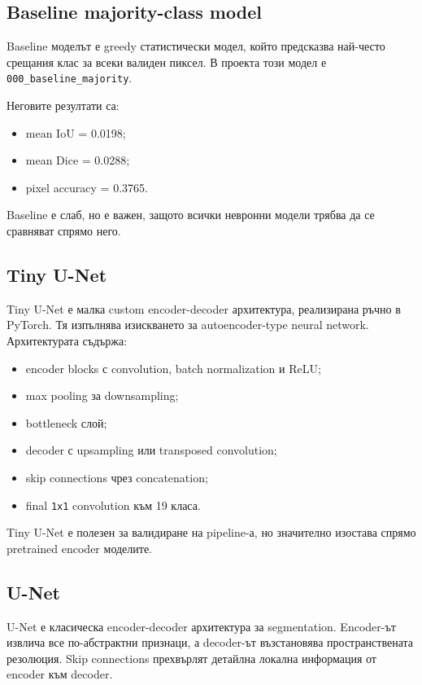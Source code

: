 \documentclass[12pt,a4paper]{article}
\newcommand{\code}[1]{\texttt{#1}}
\begin{document}
\subsection{Baseline majority-class model}

Baseline моделът е greedy статистически модел, който предсказва най-често срещания клас за всеки валиден пиксел. В проекта този модел е \code{000\_baseline\_majority}.

Неговите резултати са:

\begin{itemize}
  \item mean IoU = 0.0198;
  \item mean Dice = 0.0288;
  \item pixel accuracy = 0.3765.
\end{itemize}

Baseline е слаб, но е важен, защото всички невронни модели трябва да се сравняват спрямо него.

\subsection{Tiny U-Net}

Tiny U-Net е малка custom encoder-decoder архитектура, реализирана ръчно в PyTorch. Тя изпълнява изискването за autoencoder-type neural network. Архитектурата съдържа:

\begin{itemize}
  \item encoder blocks с convolution, batch normalization и ReLU;
  \item max pooling за downsampling;
  \item bottleneck слой;
  \item decoder с upsampling или transposed convolution;
  \item skip connections чрез concatenation;
  \item final \code{1x1} convolution към 19 класа.
\end{itemize}

Tiny U-Net е полезен за валидиране на pipeline-а, но значително изостава спрямо pretrained encoder моделите.

\subsection{U-Net}

U-Net е класическа encoder-decoder архитектура за segmentation. Encoder-ът извлича все по-абстрактни признаци, а decoder-ът възстановява пространствената резолюция. Skip connections прехвърлят детайлна локална информация от encoder към decoder.
\end{document}

